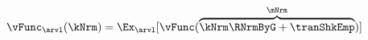   \begin{equation}\begin{gathered}\begin{aligned}
        \vFunc_{\arvl}(\kNrm) & = \Ex_{\arvl}[\vFunc(\overbrace{\kNrm \RNrmByG + \tranShkEmp}^{\mNrm})]  \label{eq:vBegStg}
      \end{aligned}\end{gathered}\end{equation}
